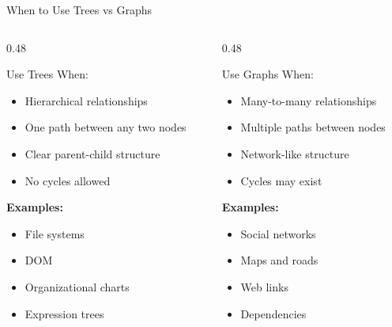 \documentclass[aspectratio=169,xcolor=dvipsnames]{beamer}
\begin{document}
\begin{frame}{When to Use Trees vs Graphs}
  \begin{columns}
    \begin{column}{0.48\textwidth}
      \begin{block}{Use Trees When:}
        \begin{itemize}
          \item Hierarchical relationships
          \item One path between any two nodes
          \item Clear parent-child structure
          \item No cycles allowed
        \end{itemize}

        \vspace{0.2cm}

        \textbf{Examples:}
        \begin{itemize}
          \item File systems
          \item DOM
          \item Organizational charts
          \item Expression trees
        \end{itemize}
      \end{block}
    \end{column}
    \begin{column}{0.48\textwidth}
      \begin{block}{Use Graphs When:}
        \begin{itemize}
          \item Many-to-many relationships
          \item Multiple paths between nodes
          \item Network-like structure
          \item Cycles may exist
        \end{itemize}

        \vspace{0.2cm}

        \textbf{Examples:}
        \begin{itemize}
          \item Social networks
          \item Maps and roads
          \item Web links
          \item Dependencies
        \end{itemize}
      \end{block}
    \end{column}
  \end{columns}
\end{frame}
\end{document}
